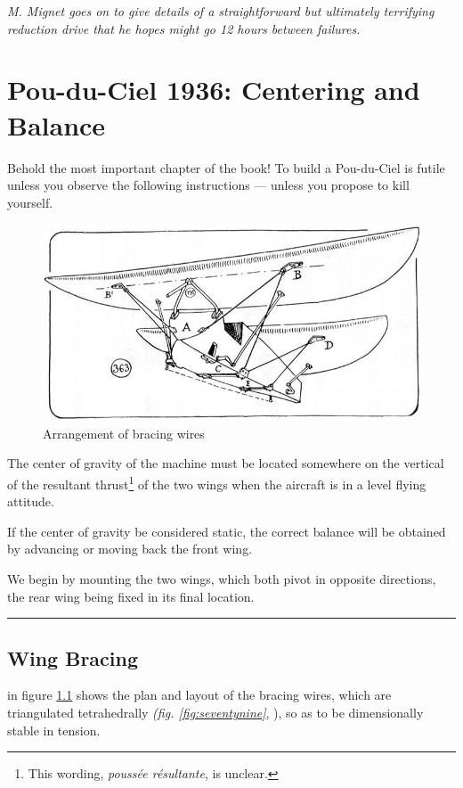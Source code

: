 \documentclass{book}
\newcommand*\circled[1]{\tikz[baseline=(char.base)]{
    \node[shape=circle,draw,inner sep=0.15pt] (char) {\footnotesize#1};}}
\newcommand*\sectline{
  \vspace{5pt}
  \begin{center}
    \rule{0.5\linewidth}{\linethickness}
  \end{center}
  \vspace{5pt}
}
\begin{document}
\textit{M. Mignet goes on to give details of a straightforward but
  ultimately terrifying reduction drive that he hopes might go 12
  hours between failures.}

\chapter{Pou-du-Ciel 1936: Centering and Balance}

Behold the most important chapter of the book!  To build a Pou-du-Ciel
is futile unless you observe the following instructions --- unless you
propose to kill yourself.

\begin{figure}
  \includegraphics[width=\linewidth]{fig-78.jpg}
  \caption{Arrangement of bracing wires}
  \label{fig:seventyeight}
\end{figure}

The center of gravity of the machine must be located somewhere on the
vertical of the resultant thrust\footnote{This wording,
  \textit{pouss\'ee r\'esultante}, is unclear.} of the two wings when
the aircraft is in a level flying attitude.

If the center of gravity be considered static, the correct balance
will be obtained by advancing or moving back the front wing.

We begin by mounting the two wings, which both pivot in opposite
directions, the rear wing being fixed in its final location.

\sectline

\section{Wing Bracing}

\circled{363} in figure \ref{fig:seventyeight} shows the plan and
layout of the bracing wires, which are triangulated tetrahedrally
\textit{(fig. \ref{fig:seventynine}}, \circled{364}), so as to be
dimensionally stable in tension.
\end{document}
